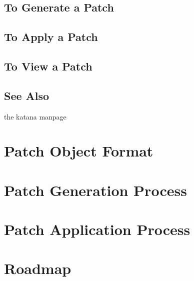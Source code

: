 \documentclass[11pt]{article}
\begin{document}
\subsection{To Generate a Patch}
\label{sec-4.2}

\subsection{To Apply a Patch}
\label{sec-4.3}

\subsection{To View a Patch}
\label{sec-4.4}

\subsection{See Also}
\label{sec-4.5}

   the katana manpage
\section{Patch Object Format}
\label{sec-5}

\section{Patch Generation Process}
\label{sec-6}

\section{Patch Application Process}
\label{sec-7}

\section{Roadmap}
\label{sec-8}
\end{document}
